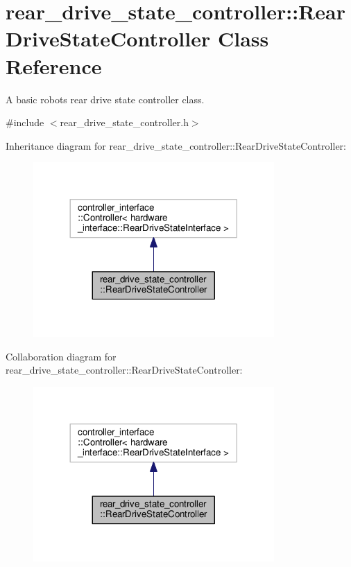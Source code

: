 \hypertarget{classrear__drive__state__controller_1_1RearDriveStateController}{}\section{rear\+\_\+drive\+\_\+state\+\_\+controller\+:\+:Rear\+Drive\+State\+Controller Class Reference}
\label{classrear__drive__state__controller_1_1RearDriveStateController}


A basic robot\textquotesingle{}s rear drive state controller class.  




{\ttfamily \#include $<$rear\+\_\+drive\+\_\+state\+\_\+controller.\+h$>$}



Inheritance diagram for rear\+\_\+drive\+\_\+state\+\_\+controller\+:\+:Rear\+Drive\+State\+Controller\+:\nopagebreak
\begin{figure}[H]
\begin{center}
\leavevmode
\includegraphics[width=260pt]{classrear__drive__state__controller_1_1RearDriveStateController__inherit__graph}
\end{center}
\end{figure}


Collaboration diagram for rear\+\_\+drive\+\_\+state\+\_\+controller\+:\+:Rear\+Drive\+State\+Controller\+:\nopagebreak
\begin{figure}[H]
\begin{center}
\leavevmode
\includegraphics[width=260pt]{classrear__drive__state__controller_1_1RearDriveStateController__coll__graph}
\end{center}
\end{figure}
